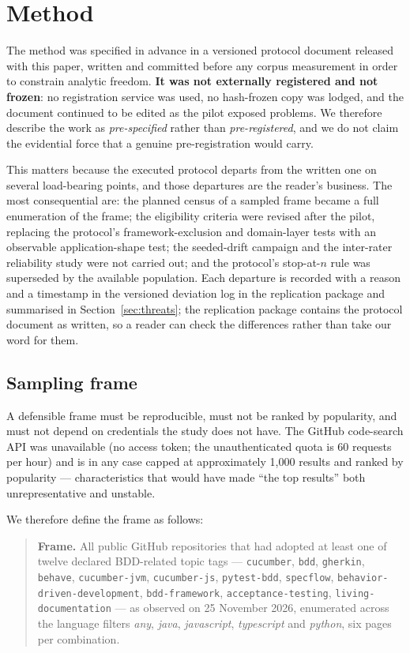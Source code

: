 \section{Method}
\label{sec:method}

The method was specified in advance in a versioned protocol document released with this paper, written
and committed before any corpus measurement in order to constrain analytic freedom. \textbf{It was not
externally registered and not frozen}: no registration service was used, no hash-frozen copy was
lodged, and the document continued to be edited as the pilot exposed problems. We therefore describe
the work as \emph{pre-specified} rather than \emph{pre-registered}, and we do not claim the evidential
force that a genuine pre-registration would carry.

This matters because the executed protocol departs from the written one on several load-bearing points,
and those departures are the reader's business. The most consequential are: the planned census of a
sampled frame became a full enumeration of the frame; the eligibility criteria were revised after the
pilot, replacing the protocol's framework-exclusion and domain-layer tests with an observable
application-shape test; the seeded-drift campaign and the inter-rater reliability study were not
carried out; and the protocol's stop-at-$n$ rule was superseded by the available population. Each
departure is recorded with a reason and a timestamp in the versioned deviation log in the replication package and summarised in
Section~\ref{sec:threats}; the replication package contains the protocol document as written, so a
reader can check the differences rather than take our word for them.

\subsection{Sampling frame}

A defensible frame must be reproducible, must not be ranked by popularity, and must not depend on
credentials the study does not have. The GitHub code-search API was unavailable (no access token;
the unauthenticated quota is 60 requests per hour) and is in any case capped at approximately 1{,}000
results and ranked by popularity --- characteristics that would have made ``the top results'' both
unrepresentative and unstable.

We therefore define the frame as follows:

\begin{quote}
\raggedright
\textbf{Frame.} All public GitHub repositories that had adopted at least one of twelve declared
BDD-related topic tags --- \texttt{cucumber}, \texttt{bdd}, \texttt{gherkin}, \texttt{behave},
\texttt{cucumber-jvm}, \texttt{cucumber-js}, \texttt{pytest-bdd}, \texttt{specflow},
\texttt{behavior-driven-development}, \texttt{bdd-framework}, \texttt{acceptance-testing},
\texttt{living-documentation} --- as observed on 25 November 2026, enumerated across the language
filters \emph{any}, \emph{java}, \emph{javascript}, \emph{typescript} and \emph{python}, six pages per
combination.
\end{quote}

